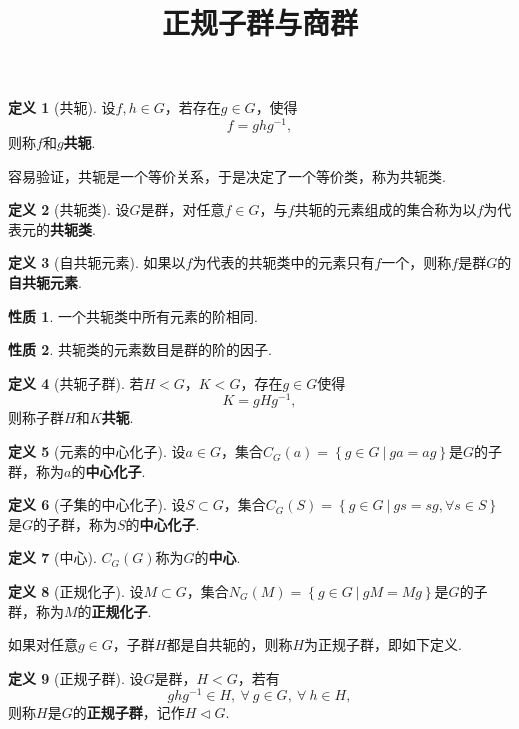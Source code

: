 \documentclass[12pt]{ctexart}
\title{\vspace{-2em}\textbf{正规子群与商群}\vspace{-2em}}
\date{ }
\theoremstyle{definition}
\newtheorem{definition}{定义}
\newtheorem{property}{性质}
\theoremstyle{plain}
\begin{document}
	\maketitle
	\begin{definition}[共轭]
		设$f,h\in G$，若存在$g\in G$，使得
		$$f=ghg^{-1},$$
		则称$f$和$g$\textbf{共轭}.
	\end{definition}
	容易验证，共轭是一个等价关系，于是决定了一个等价类，称为共轭类.
	\begin{definition}[共轭类]
		设$G$是群，对任意$f\in G$，与$f$共轭的元素组成的集合称为以$f$为代表元的\textbf{共轭类}.
	\end{definition}
	\begin{definition}[自共轭元素]
		如果以$f$为代表的共轭类中的元素只有$f$一个，则称$f$是群$G$的\textbf{自共轭元素}.
	\end{definition}
	\begin{property}
		一个共轭类中所有元素的阶相同.
	\end{property}
	\begin{property}
		共轭类的元素数目是群的阶的因子.
	\end{property}
	\begin{definition}[共轭子群]
		若$H<G$，$K<G$，存在$g\in G$使得
		$$K=gHg^{-1},$$
		则称子群$H$和$K$\textbf{共轭}.
	\end{definition}
	\begin{definition}[元素的中心化子]
		设$a\in G$，集合$C_G(a)=\left\{g\in G\ |\ ga=ag\right\}$是$G$的子群，称为$a$的\textbf{中心化子}.
	\end{definition}
	\begin{definition}[子集的中心化子]
		设$S\subset G$，集合$C_G(S)=\left\{
		g\in G\ |\ gs=sg,\forall s\in S\right\}$是$G$的子群，称为$S$的\textbf{中心化子}.
	\end{definition}
	\begin{definition}[中心]
		$C_G(G)$称为$G$的\textbf{中心}.
	\end{definition}
	\begin{definition}[正规化子]
		设$M\subset G$，集合$N_G(M)=\left\{g\in G\ |\ gM=Mg\right\}$是$G$的子群，称为$M$的\textbf{正规化子}.
	\end{definition}
	如果对任意$g\in G$，子群$H$都是自共轭的，则称$H$为正规子群，即如下定义.
	\begin{definition}[正规子群]
		设$G$是群，$H<G$，若有
		$$ghg^{-1}\in H,\ \forall\ g\in G,\ \forall\ h\in H,$$
		则称$H$是$G$的\textbf{正规子群}，记作$H\vartriangleleft G$.
	\end{definition}
\end{document}
